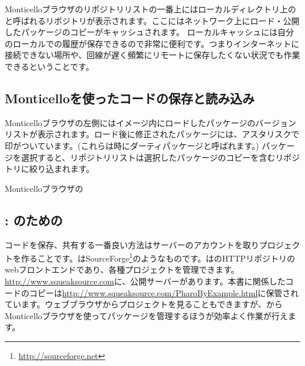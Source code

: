 \documentclass[a4paper,10pt,twoside]{book}
\begin{document}
Monticelloブラウザのリポジトリリストの一番上にはローカルディレクトリ上の と呼ばれるリポジトリが表示されます。ここにはネットワーク上にロード・公開したパッケージのコピーがキャッシュされます。
ローカルキャッシュには自分のローカルでの履歴が保存できるので非常に便利です。つまりインターネットに接続できない場所や、回線が遅く頻繁にリモートに保存したくない状況でも作業できるということです。

\subsection{Monticelloを使ったコードの保存と読み込み}
Monticelloブラウザの左側にはイメージ内にロードしたパッケージのバージョンリストが表示されます。ロード後に修正されたパッケージには、アスタリスクで印がついています。(これらは時にダーティパッケージと呼ばれます。) パッケージを選択すると、リポジトリリストは選択したパッケージのコピーを含むリポジトリに絞り込まれます。


Monticelloブラウザの

\subsection{\ind{\sqsrc}: \pharo のための}

コードを保存、共有する一番良い方法は\sqsrc サーバーのアカウントを取りプロジェクトを作ることです。\sqsrc はSourceForge\footnote{\url{http://sourceforge.net}}のようなものです。\sqsrc はのHTTPリポジトリのwebフロントエンドであり、各種プロジェクトを管理できます。
\url{http://www.squeaksource.com}に、公開\sqsrc サーバーがあります。本書に関係したコードのコピーは\url{http://www.squeaksource.com/PharoByExample.html}に保管されています。ウェブブラウザからプロジェクトを見ることもできますが、\pharo からMonticelloブラウザを使ってパッケージを管理するほうが効率よく作業が行えます。

\end{document}
